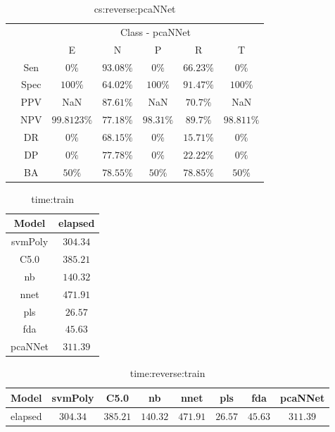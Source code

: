 \begin{table}[!ht]
	\centering
	\begin{tabular}{|c|c|c|c|c|c|c|}
		\cline{3-7}
		\multicolumn{2}{c|}{} & \multicolumn{5}{c|}{Class - pcaNNet} \\ \cline{3-7}
		\multicolumn{2}{c|}{} & E & N & P & R & T \\ \hline
		\multirow{7}{*}{\rotatebox{90}{Statistics}} & Sen & $0\%$ & $93.08\%$ & $0\%$ & $66.23\%$ & $0\%$ \\ \cline{2-7}
		 & Spec & $100\%$ & $64.02\%$ & $100\%$ & $91.47\%$ & $100\%$ \\ \cline{2-7}
		 & PPV & NaN & $87.61\%$ & NaN & $70.7\%$ & NaN \\ \cline{2-7}
		 & NPV & $99.8123\%$ & $77.18\%$ & $98.31\%$ & $89.7\%$ & $98.811\%$ \\ \cline{2-7}
		 & DR & $0\%$ & $68.15\%$ & $0\%$ & $15.71\%$ & $0\%$ \\ \cline{2-7}
		 & DP & $0\%$ & $77.78\%$ & $0\%$ & $22.22\%$ & $0\%$ \\ \cline{2-7}
		 & BA & $50\%$ & $78.55\%$ & $50\%$ & $78.85\%$ & $50\%$ \\ \hline
	\end{tabular}
	\caption{cs:reverse:pcaNNet}
	\label{tab:cs:reverse:pcaNNet}
\end{table}

\begin{table}[!ht]
	\centering
	\begin{tabular}{|c|c|}
		\hline
		Model & elapsed \\ \hline
		svmPoly & $304.34$ \\ \hline
		C5.0 & $385.21$ \\ \hline
		nb & $140.32$ \\ \hline
		nnet & $471.91$ \\ \hline
		pls & $26.57$ \\ \hline
		fda & $45.63$ \\ \hline
		pcaNNet & $311.39$ \\ \hline
	\end{tabular}
	\caption{time:train}
	\label{tab:time:train}
\end{table}

\begin{table}[!ht]
	\centering
	\begin{tabular}{|c|c|c|c|c|c|c|c|}
		\hline
		Model & svmPoly & C5.0 & nb & nnet & pls & fda & pcaNNet \\ \hline
		elapsed & $304.34$ & $385.21$ & $140.32$ & $471.91$ & $26.57$ & $45.63$ & $311.39$ \\ \hline
	\end{tabular}
	\caption{time:reverse:train}
	\label{tab:time:reverse:train}
\end{table}

